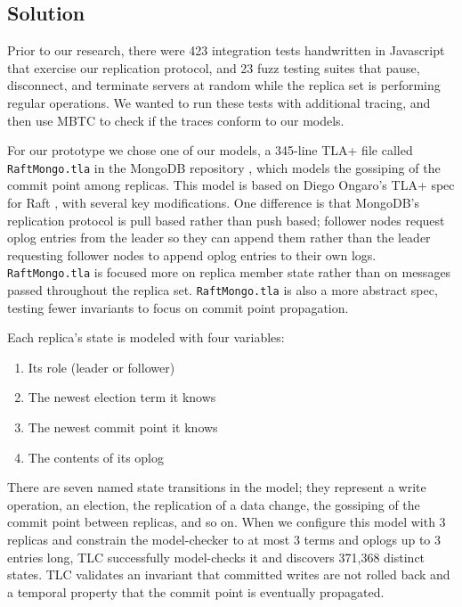 \documentclass{vldb}
\begin{document}
\subsection{Solution}
\label{subsec:mbtc_solution}

Prior to our research, there were 423 integration tests handwritten in Javascript that exercise our replication protocol, and 23 fuzz testing suites that pause, disconnect, and terminate servers at random while the replica set is performing regular operations. 
We wanted to run these tests with additional tracing, and then use MBTC to check if the traces conform to our models.

For our prototype we chose one of our models, a 345-line TLA+ file called \texttt{RaftMongo.tla} in the MongoDB repository \cite{MongoGitHub}, which models the gossiping of the commit point among replicas.
This model is based on Diego Ongaro's TLA+ spec for Raft \cite{Ongaro14TLA+Raft}, with several key modifications.
One difference is that MongoDB's replication protocol is pull based rather than push based; follower nodes request oplog entries from the leader so they can append them rather than the leader requesting follower nodes to append oplog entries to their own logs.
\texttt{RaftMongo.tla} is focused more on replica member state rather than on messages passed throughout the replica set.
\texttt{RaftMongo.tla} is also a more abstract spec, testing fewer invariants to focus on commit point propagation.

Each replica's state is modeled with four variables:

\begin{enumerate}
\item Its role (leader or follower)
\item The newest election term it knows
\item The newest commit point it knows
\item The contents of its oplog
\end{enumerate}

There are seven named state transitions in the model; they represent a write operation, an election, the replication of a data change, the gossiping of the commit point between replicas, and so on. 
When we configure this model with 3 replicas and constrain the model-checker to at most 3 terms and oplogs up to 3 entries long, TLC successfully model-checks it and discovers 371,368 distinct states.
TLC validates an invariant that committed writes are not rolled back and a temporal property that the commit point is eventually propagated.
\end{document}
